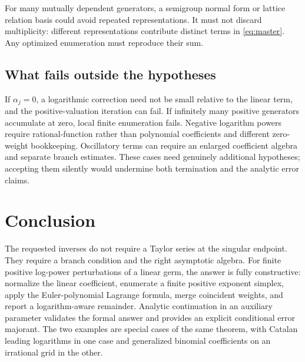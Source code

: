 \documentclass[11pt,a4paper]{article}
\theoremstyle{definition}
\begin{document}
For many mutually dependent generators, a semigroup normal form or lattice
relation basis could avoid repeated representations. It must not discard
multiplicity: different representations contribute distinct terms in
\eqref{eq:master}. Any optimized enumeration must reproduce their sum.

\subsection{What fails outside the hypotheses}
If \(\alpha_j=0\), a logarithmic correction need not be small relative to the
linear term, and the positive-valuation iteration can fail. If infinitely many
positive generators accumulate at zero, local finite enumeration fails.
Negative logarithm powers require rational-function rather than polynomial
coefficients and different zero-weight bookkeeping. Oscillatory terms can
require an enlarged coefficient algebra and separate branch estimates.
These cases need genuinely additional hypotheses; accepting them silently
would undermine both termination and the analytic error claims.

\section{Conclusion}
The requested inverses do not require a Taylor series at the singular
endpoint. They require a branch condition and the right asymptotic algebra.
For finite positive log-power perturbations of a linear germ, the answer is
fully constructive: normalize the linear coefficient, enumerate a finite
positive exponent simplex, apply the Euler-polynomial Lagrange formula,
merge coincident weights, and report a logarithm-aware remainder. Analytic
continuation in an auxiliary parameter validates the formal answer and
provides an explicit conditional error majorant. The two examples are
special cases of the same theorem, with Catalan leading logarithms in one
case and generalized binomial coefficients on an irrational grid in the
other.

\appendix
\end{document}
